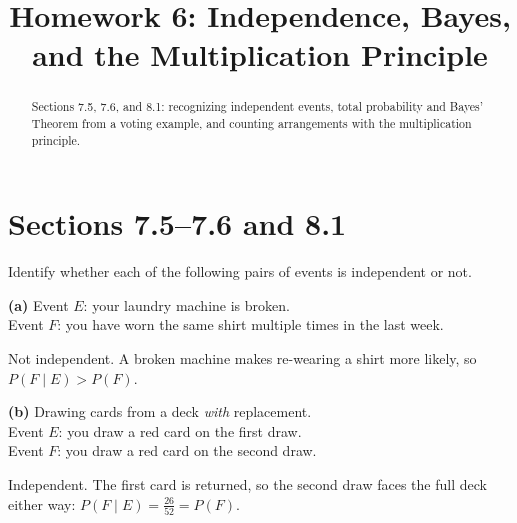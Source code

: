 \documentclass[12pt]{ximera}
\title{Homework 6: Independence, Bayes, and the Multiplication Principle}
\begin{document}
\begin{abstract}
Sections 7.5, 7.6, and 8.1: recognizing independent events, total probability and
Bayes' Theorem from a voting example, and counting arrangements with the
multiplication principle.
\end{abstract}
\maketitle

\section*{Sections 7.5--7.6 and 8.1}

\begin{problem}
Identify whether each of the following pairs of events is independent or not.

\begin{prompt}
\textbf{(a)} Event $E$: your laundry machine is broken. \\
Event $F$: you have worn the same shirt multiple times in the last week.

\begin{multipleChoice}
\end{multipleChoice}

\begin{feedback}
Not independent. A broken machine makes re-wearing a shirt more likely, so
$P(F\mid E)>P(F)$.
\end{feedback}
\end{prompt}

\begin{prompt}
\textbf{(b)} Drawing cards from a deck \emph{with} replacement. \\
Event $E$: you draw a red card on the first draw. \\
Event $F$: you draw a red card on the second draw.

\begin{multipleChoice}
\end{multipleChoice}

\begin{feedback}
Independent. The first card is returned, so the second draw faces the full deck either
way: $P(F\mid E)=\frac{26}{52}=P(F)$.
\end{feedback}
\end{prompt}


\end{problem}
\end{document}

